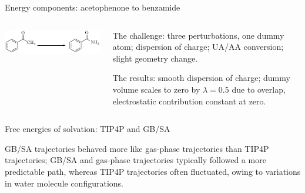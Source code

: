 \documentclass[10pt]{beamer}
\begin{document}
\begin{frame}{Energy components: acetophenone to benzamide}

    \begin{columns}

        \begin{column}{0.65\textwidth}

\begin{center}
\hspace*{1cm}\includegraphics[scale=0.7]{figures/comenh2rxn.pdf}\\
\scalebox{.5}{}\hspace*{-1cm}\scalebox{.5}{}\\
\scalebox{.5}{}\hspace*{-1cm}\scalebox{.5}{}
\end{center} 

        \end{column}
        
        \begin{column}{0.3\textwidth}  
        
The challenge: three perturbations, one dummy atom; dispersion of charge; UA/AA conversion; slight geometry change.
\bigskip

The results: smooth dispersion of charge; dummy volume scales to zero by $\lambda = 0.5$ due to overlap, electrostatic contribution constant at zero.

        \end{column}

    \end{columns}

\end{frame}


\begin{frame}[t]{Free energies of solvation: TIP4P and GB/SA}

\begin{center}
\scalebox{.7}{}
\end{center}

GB/SA trajectories behaved more like gas-phase trajectories than TIP4P trajectories; GB/SA and gas-phase trajectories typically followed a more predictable path, whereas TIP4P trajectories often fluctuated, owing to variations in water molecule configurations.

\end{frame}
\end{document}
